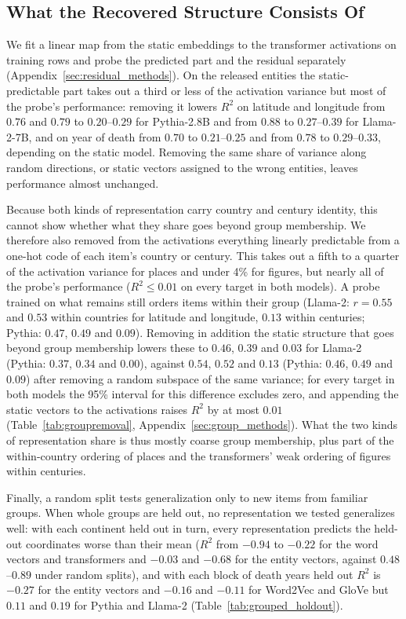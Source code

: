 \documentclass[11pt]{article}
\begin{document}
\subsection{What the Recovered Structure Consists Of}
\label{sec:mechanism-summary}

We fit a linear map from the static embeddings to the transformer activations on training
rows and probe the predicted part and the residual separately (Appendix~\ref{sec:residual_methods}).
On the released entities the static-predictable part takes out a third or less of the
activation variance but most of the probe's performance: removing it lowers $R^2$ on latitude
and longitude from $0.76$ and $0.79$ to $0.20$--$0.29$ for Pythia-2.8B and from $0.88$ to
$0.27$--$0.39$ for Llama-2-7B, and on year of death from $0.70$ to $0.21$--$0.25$ and from
$0.78$ to $0.29$--$0.33$, depending on the static model. Removing the same share of variance
along random directions, or static vectors assigned to the wrong entities, leaves performance
almost unchanged.

Because both kinds of representation carry country and century identity, this cannot show
whether what they share goes beyond group membership. We therefore also removed from the
activations everything linearly predictable from a one-hot code of each item's country or
century. This takes out a fifth to a quarter of the activation variance for places and under
4\% for figures, but nearly all of the probe's performance ($R^2 \leq 0.01$ on every target
in both models). A probe trained on what remains still orders items within their group
(Llama-2: $r = 0.55$ and $0.53$ within countries for latitude and longitude, $0.13$ within
centuries; Pythia: $0.47$, $0.49$ and $0.09$). Removing in addition the static structure that
goes beyond group membership lowers these to $0.46$, $0.39$ and $0.03$ for Llama-2 (Pythia:
$0.37$, $0.34$ and $0.00$), against $0.54$, $0.52$ and $0.13$ (Pythia: $0.46$, $0.49$ and
$0.09$) after removing a random subspace of the same variance; for every target in both models
the 95\% interval for this difference excludes zero, and appending the static vectors to the
activations raises $R^2$ by at most $0.01$ (Table~\ref{tab:groupremoval}, Appendix~\ref{sec:group_methods}).
What the two kinds of representation share is thus mostly coarse group membership, plus part of the within-country ordering of places and the transformers' weak ordering of figures within centuries.

Finally, a random split tests generalization only to new items from familiar groups. When
whole groups are held out, no representation we tested generalizes well: with each continent
held out in turn, every representation predicts the held-out coordinates worse than their mean
($R^2$ from $-0.94$ to $-0.22$ for the word vectors and transformers and $-0.03$ and $-0.68$ for the entity vectors, against $0.48$--$0.89$ under random splits), and with each block of death
years held out $R^2$ is $-0.27$ for the entity vectors and $-0.16$ and $-0.11$ for Word2Vec and GloVe but $0.11$ and $0.19$ for
Pythia and Llama-2 (Table~\ref{tab:grouped_holdout}).
\end{document}
